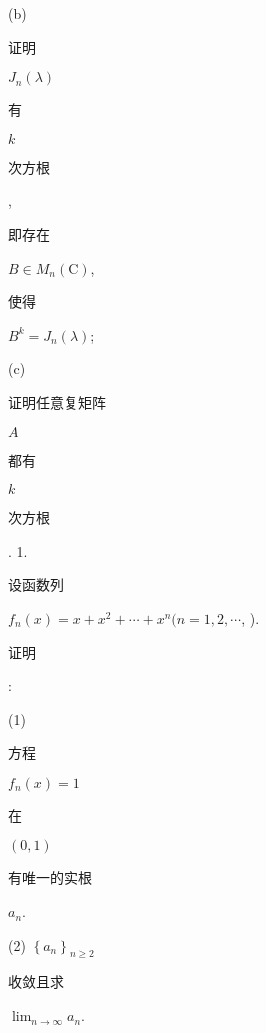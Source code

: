 \documentclass[10pt]{article}
\begin{document}
(b) \begin{CJK}{UTF8}{mj}证明\end{CJK} $J_{n}(\lambda)$ \begin{CJK}{UTF8}{mj}有\end{CJK} $k$ \begin{CJK}{UTF8}{mj}次方根\end{CJK}, \begin{CJK}{UTF8}{mj}即存在\end{CJK} $B \in M_{n}(\mathrm{C})$, \begin{CJK}{UTF8}{mj}使得\end{CJK} $B^{k}=J_{n}(\lambda)$;

(c) \begin{CJK}{UTF8}{mj}证明任意复矩阵\end{CJK} $A$ \begin{CJK}{UTF8}{mj}都有\end{CJK} $k$ \begin{CJK}{UTF8}{mj}次方根\end{CJK}. 1. \begin{CJK}{UTF8}{mj}设函数列\end{CJK} $f_{n}(x)=x+x^{2}+\cdots+x^{n}(n=1,2, \cdots$, ). \begin{CJK}{UTF8}{mj}证明\end{CJK}:

(1) \begin{CJK}{UTF8}{mj}方程\end{CJK} $f_{n}(x)=1$ \begin{CJK}{UTF8}{mj}在\end{CJK} $(0,1)$ \begin{CJK}{UTF8}{mj}有唯一的实根\end{CJK} $a_{n}$.

(2) $\left\{a_{n}\right\}_{n \geq 2}$ \begin{CJK}{UTF8}{mj}收敛且求\end{CJK} $\lim _{n \rightarrow \infty} a_{n}$.
\end{document}
